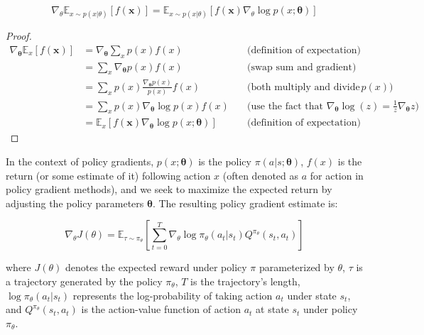 \begin{equation}
\nabla_\theta \mathbb{E}_{x \sim p(x|\theta)}[f(\boldsymbol{x})] = \mathbb{E}_{x \sim p(x|\theta)}[f(\boldsymbol{x})\nabla_\theta \log p(x; \boldsymbol{\theta})]
\end{equation}
\begin{proof}
    \begin{align*}
    \nabla_{\boldsymbol{\theta}} \mathbb{E}_{x}[f(\boldsymbol{x})] & = \nabla_{\boldsymbol{\theta}} \sum_{x} p(x) f(x) \quad & \text{(definition of expectation)} \\
    & = \sum_{x} \nabla_{\boldsymbol{\theta}} p(x) f(x) \quad & \text{(swap sum and gradient)} \\
    & = \sum_{x} p(x) \frac{\nabla_{\boldsymbol{\theta}} p(x)}{p(x)} f(x) \quad & \text{(both multiply and divide by } p(x)) \\
    & = \sum_{x} p(x) \nabla_{\boldsymbol{\theta}} \log p(x) f(x) \quad & \text{(use the fact that } \nabla_{\boldsymbol{\theta}} \log(z) = \frac{1}{z} \nabla_{\boldsymbol{\theta}} z) \\
    & = \mathbb{E}_{x}[f(\boldsymbol{x}) \nabla_{\boldsymbol{\theta}} \log p(x;\boldsymbol{\theta})] \quad & \text{(definition of expectation)}
    \end{align*}
\end{proof}
In the context of policy gradients, $p(x; \boldsymbol{\theta})$ is the policy $\pi(a|s; \boldsymbol{\theta})$, $f(x)$ is the return (or some estimate of it) following action $x$ (often denoted as $a$ for action in policy gradient methods), and we seek to maximize the expected return by adjusting the policy parameters $\boldsymbol{\theta}$. The resulting policy gradient estimate is:

\begin{equation}
\nabla_{\theta} J(\theta) = \mathbb{E}_{\tau \sim \pi_\theta} \left[\sum_{t=0}^{T} \nabla_{\theta} \log \pi_{\theta}(a_t|s_t) Q^{\pi_{\theta}}(s_t, a_t)\right]
\end{equation}

where $J(\theta)$ denotes the expected reward under policy $\pi$ parameterized by $\theta$, $\tau$ is a trajectory generated by the policy $\pi_\theta$, $T$ is the trajectory's length, $\log \pi_{\theta}(a_t|s_t)$ represents the log-probability of taking action $a_t$ under state $s_t$, and $Q^{\pi_{\theta}}(s_t, a_t)$ is the action-value function of action $a_t$ at state $s_t$ under policy $\pi_{\theta}$.


